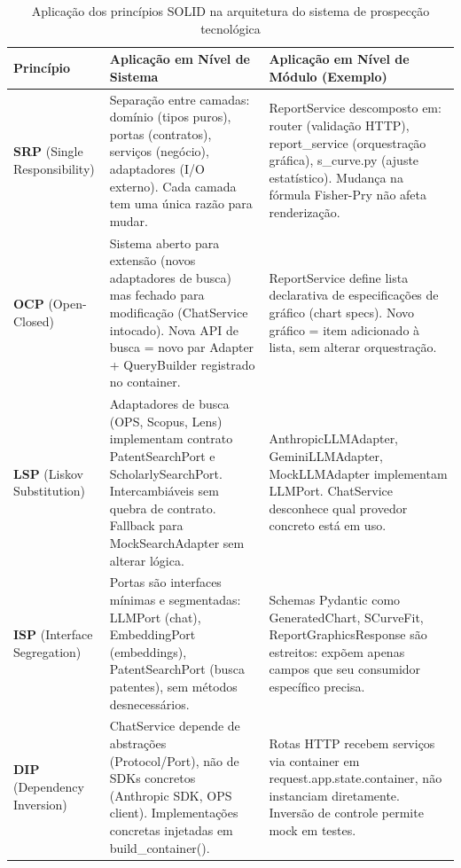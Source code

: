 \documentclass[12pt, a4paper]{article}
\begin{document}
\begin{table}[H]
\centering
\small
\caption{Aplicação dos princípios SOLID na arquitetura do sistema de prospecção tecnológica}
\label{tab:solid}
\begin{tabular}{|p{2.2cm}|p{5.0cm}|p{5.5cm}|}
\hline
\textbf{Princípio} & \textbf{Aplicação em Nível de Sistema} & \textbf{Aplicação em Nível de Módulo (Exemplo)} \\
\hline
\textbf{SRP} (Single Responsibility) & Separação entre camadas: domínio (tipos puros), portas (contratos), serviços (negócio), adaptadores (I/O externo). Cada camada tem uma única razão para mudar. & ReportService descomposto em: router (validação HTTP), report\_service (orquestração gráfica), s\_curve.py (ajuste estatístico). Mudança na fórmula Fisher-Pry não afeta renderização. \\
\hline
\textbf{OCP} (Open-Closed) & Sistema aberto para extensão (novos adaptadores de busca) mas fechado para modificação (ChatService intocado). Nova API de busca = novo par Adapter + QueryBuilder registrado no container. & ReportService define lista declarativa de especificações de gráfico (chart specs). Novo gráfico = item adicionado à lista, sem alterar orquestração. \\
\hline
\textbf{LSP} (Liskov Substitution) & Adaptadores de busca (OPS, Scopus, Lens) implementam contrato PatentSearchPort e ScholarlySearchPort. Intercambiáveis sem quebra de contrato. Fallback para MockSearchAdapter sem alterar lógica. & AnthropicLLMAdapter, GeminiLLMAdapter, MockLLMAdapter implementam LLMPort. ChatService desconhece qual provedor concreto está em uso. \\
\hline
\textbf{ISP} (Interface Segregation) & Portas são interfaces mínimas e segmentadas: LLMPort (chat), EmbeddingPort (embeddings), PatentSearchPort (busca patentes), sem métodos desnecessários. & Schemas Pydantic como GeneratedChart, SCurveFit, ReportGraphicsResponse são estreitos: expõem apenas campos que seu consumidor específico precisa. \\
\hline
\textbf{DIP} (Dependency Inversion) & ChatService depende de abstrações (Protocol/Port), não de SDKs concretos (Anthropic SDK, OPS client). Implementações concretas injetadas em build\_container(). & Rotas HTTP recebem serviços via container em request.app.state.container, não instanciam diretamente. Inversão de controle permite mock em testes. \\
\hline
\end{tabular}
\end{table}
\end{document}
